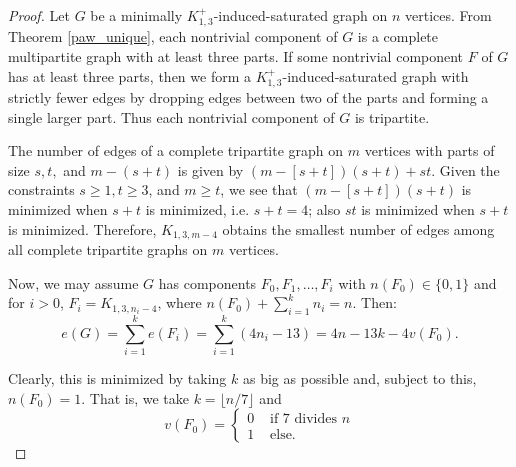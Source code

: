 \documentclass[12pt]{amsart}
\theoremstyle{plain}
\theoremstyle{definition}
\theoremstyle{remark}
\newcommand{\paw}{\ensuremath{K_{1,3}^+}\xspace}
\begin{document}
\begin{proof}
Let $G$ be a minimally \paw-induced-saturated graph on $n$ vertices.
From Theorem \ref{paw_unique}, each nontrivial component of $G$ is a complete multipartite graph with at least three parts.
If some nontrivial component $F$ of $G$ has at least three parts, then we form a \paw-induced-saturated graph with strictly fewer edges
 by dropping edges between two of the parts and forming a single larger part.
Thus each nontrivial component of $G$ is tripartite.

The number of edges of a complete tripartite graph on $m$ vertices with parts of size $s,t,$ and $m-(s+t)$ is given by $(m-[s+t])(s+t)+st$.
Given the constraints $s\geq1, t\geq3$, and $m\geq t$, we
see that $(m-[s+t])(s+t)$ is minimized when $s+t$ is minimized, i.e. $s+t=4$; also $st$ is minimized when $s+t$ is minimized.
Therefore, $K_{1,3,m-4}$ obtains the smallest number of edges among all complete tripartite graphs on $m$ vertices.

Now, we may assume $G$ has components $F_0,F_1,\ldots,F_i$ with $n(F_0) \in \{0,1\}$
and for $i>0$, $F_i=K_{1,3,n_i-4}$, where $n(F_0)+\sum_{i=1}^kn_i=n$.
Then:
$$e(G) = \sum_{i=1}^k e(F_i)= \sum_{i=1}^k (4n_i-13)=
4n-13k-4v(F_0).$$

Clearly, this is minimized by taking $k$ as big as possible and, subject to this, $n(F_0)=1$.
That is, we take $k=\lfloor n/7 \rfloor$ and
\begin{displaymath}v(F_0)=\left\{\begin{array}{rl}
0 & \mbox{ if 7 divides $n$}\\
1 & \mbox{ else.}
\end{array}
\right.
\end{displaymath}
\end{proof}
\end{document}

